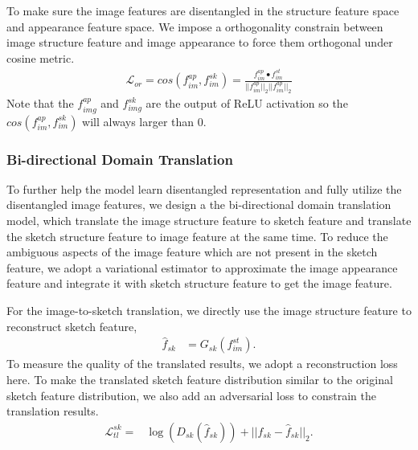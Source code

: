 \documentclass[10pt,twocolumn,letterpaper]{article}
\begin{document}
To make sure the image features are disentangled in the structure feature space and appearance feature space. 
We impose a orthogonality constrain between image structure feature and image appearance to force them orthogonal under cosine metric.
\begin{align}
    \mathcal{L}_{or} = cos(f_{im}^{ap}, f_{im}^{sk}) = \frac{f_{im}^{ap} \bullet f_{im}^{st}}{||f_{im}^{ap}||_2 ||f_{im}^{ap}||_2}
\end{align}
Note that the $f_{img}^{ap}$ and $f_{img}^{sk}$ are the output of ReLU activation so the $cos(f_{im}^{ap}, f_{im}^{sk})$ will always larger than $0$. 

\subsubsection{Bi-directional Domain Translation}
\color{red}To further help the model learn disentangled representation and fully utilize the disentangled image features, we design a the bi-directional domain translation model, which translate the image structure feature to sketch feature and translate the sketch structure feature to image feature at the same time. To reduce the ambiguous aspects of the image feature which are not present in the sketch feature, we adopt a variational estimator to approximate the image appearance feature and integrate it with sketch structure feature to get the image feature.\color{black}

For the image-to-sketch translation, we directly use the image structure feature to reconstruct sketch feature,
\begin{align}
    \hat{f}_{sk} &= G_{sk}(f_{im}^{st}).
\end{align}
To measure the quality of the translated results, we adopt a reconstruction loss here. To make the translated sketch feature distribution similar to the original sketch feature distribution, we also add an adversarial loss to constrain the translation results.
\begin{align}
    \mathcal{L}_{tl}^{sk} =& \log(D_{sk}(\hat{f}_{sk})) + ||f_{sk}-\hat{f}_{sk}||_2.
\end{align}
\end{document}
